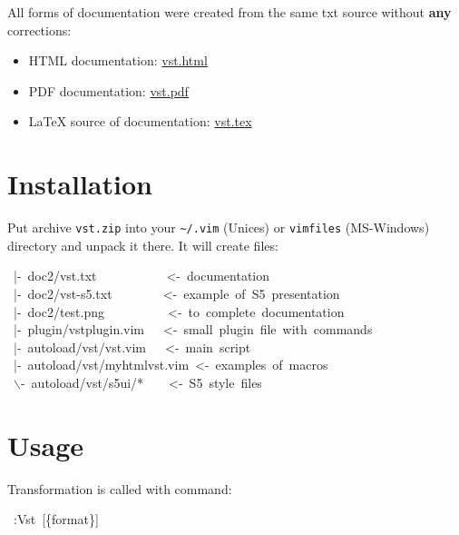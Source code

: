 \documentclass[12pt]{article}
\begin{document}
All forms of documentation were created from the same txt source without
\textbf{any} corrections:

\begin{itemize}
\item
HTML documentation: \href{http://skawina.eu.org/mikolaj/vst.html}{vst.html}

\item
PDF documentation: \href{http://skawina.eu.org/mikolaj/vst.pdf}{vst.pdf}

\item
\LaTeX{} source of documentation: \href{http://skawina.eu.org/mikolaj/vst.tex}{vst.tex}
\end{itemize}

\hypertarget{larchive}{}

\hypertarget{linstallation}{}
\section{Installation}

Put archive \texttt{vst.zip} into your \texttt{\~{}/.vim} (Unices) or \texttt{vimfiles}
(MS-Windows) directory and unpack it there. It will create files:

\begin{ttfamily}\begin{flushleft}
\mbox{~|-~doc2/vst.txt~~~~~~~~~~~<-~documentation}\\
\mbox{~|-~doc2/vst-s5.txt~~~~~~~~<-~example~of~S5~presentation}\\
\mbox{~|-~doc2/test.png~~~~~~~~~~<-~to~complete~documentation}\\
\mbox{~|-~plugin/vstplugin.vim~~~<-~small~plugin~file~with~commands}\\
\mbox{~|-~autoload/vst/vst.vim~~~<-~main~script}\\
\mbox{~|-~autoload/vst/myhtmlvst.vim~<-~examples~of~macros}\\
\mbox{~$\backslash$-~autoload/vst/s5ui/*~~~~<-~S5~style~files}\\
\end{flushleft}\end{ttfamily}

\hypertarget{lusage}{}
\section{Usage}

Transformation is called with command:

\begin{ttfamily}\begin{flushleft}
\mbox{~:Vst~[\{format\}]}\\
\end{flushleft}\end{ttfamily}
\end{document}
